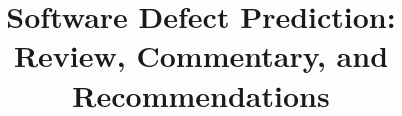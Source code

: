 \documentclass{sig-alternate-05-2015}
\begin{document}






%

\title{Software Defect Prediction: Review, Commentary, and Recommendations}
%
%
%
%
%
\end{document}
